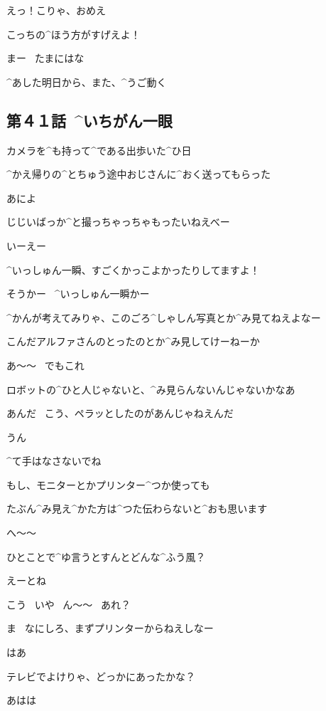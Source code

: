 \Person えっ！こりゃ、おめえ

\page
\Person こっちの^{ほう}{方}がすげえよ！

\Ayase まー
\ たまにはな

\page[130]
\Ayase ^{あした}{明日}から、また、^{うご}{動}く


\subsection{第４１話\ ^{いちがん}{一眼}}

\page[132]
\Alpha カメラを^{も}{持}って^{である}{出歩}いた^{ひ}{日}

\Alpha ^{かえ}{帰}りの^{とちゅう}{途中}おじさんに^{おく}{送}ってもらった

\page
\Ojisan あによ

\Ojisan じじいばっか^{と}{撮}っちゃっちゃもったいねえべー

\Alpha いーえー

\Alpha ^{いっしゅん}{一瞬}、すごくかっこよかったりしてますよ！

\Ojisan そうかー
\ ^{いっしゅん}{一瞬}かー

\page
\Ojisan ^{かんが}{考}えてみりゃ、このごろ^{しゃしん}{写真}とか^{み}{見}てねえよなー

\Ojisan こんだアルファさんのとったのとか^{み}{見}してけーねーか

\Alpha あ〜〜
\ でもこれ

\Alpha ロボットの^{ひと}{人}じゃないと、^{み}{見}らんないんじゃないかなあ

\Ojisan あんだ
\ こう、ペラッとしたのがあんじゃねえんだ

\Alpha うん

\Alpha ^{て}{手}はなさないでね

\Alpha もし、モニターとかプリンター^{つか}{使}っても

\Alpha たぶん^{み}{見}え^{かた}{方}は^{つた}{伝}わらないと^{おも}{思}います

\Ojisan へ〜〜

\page
\Ojisan ひとことで^{ゆ}{言}うとすんとどんな^{ふう}{風}？

\Alpha えーとね

\Alpha こう
\ いや
\ ん〜〜
\ あれ？

\Ojisan ま
\ なにしろ、まずプリンターからねえしなー

\Alpha はあ

\Ojisan テレビでよけりゃ、どっかにあったかな？

\Alpha あはは

